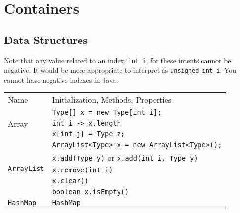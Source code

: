 \documentclass{article}
\begin{document}
\section{Containers}
\subsection{Data Structures}
Note that any value related to an index, \lstinline|int i|, for these intents cannot be negative; It would be more appropriate to interpret as \lstinline|unsigned int i|: You cannot have negative indexes in Java.
\setlength{\tabcolsep}{5pt}
\begin{center}\begin{tabularx}{\textwidth}{lX}\toprule
  Name & Initialization, Methods, Properties\\
  \multirow{3}{*}{Array} & \lstinline|Type[] x = new Type[int i];| \\
                         & \lstinline|int i -> x.length| \\
                         & \lstinline|x[int j] = Type z;| \\\midrule
  \multirow{5}{*}{\lstinline|ArrayList|} & \lstinline|ArrayList<Type> x = new ArrayList<Type>();| \\
                                         & \lstinline|x.add(Type y)| or \lstinline|x.add(int i, Type y)|\\
                                         & \lstinline|x.remove(int i)| \\
                                         & \lstinline|x.clear()| \\
                                         & \lstinline|boolean x.isEmpty()| \\
  \multirow{4}{*}{\lstinline|HashMap|} & \lstinline|HashMap| \\
\end{tabularx}\end{center}





\end{document}

